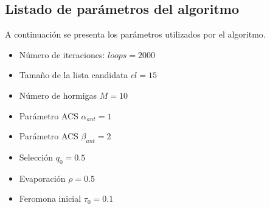 \subsection{Listado de parámetros del algoritmo}

A continuación se presenta los parámetros utilizados por el algoritmo.
\begin{itemize}
\item Número de iteraciones: $loops=2000$
\item Tamaño de la lista candidata $cl=15$
\item Número de hormigas $M=10$
\item Parámetro ACS $\alpha_{ant}=1$
\item Parámetro ACS $\beta_{ant}=2$
\item Selección $q_0=0.5$
\item Evaporación $\rho=0.5$
\item Feromona inicial $\tau_{0}=0.1$
\end{itemize}
